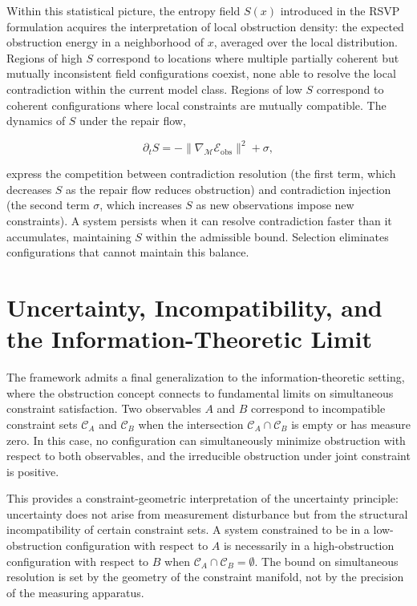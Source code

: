 \documentclass[12pt, a4paper, oneside]{article}
\theoremstyle{plain}
\theoremstyle{definition}
\theoremstyle{remark}
\newcommand{\C}{\mathcal{C}}
\begin{document}
Within this statistical picture, the entropy field $S(x)$ introduced in the RSVP formulation acquires the interpretation of local obstruction density: the expected obstruction energy in a neighborhood of $x$, averaged over the local distribution. Regions of high $S$ correspond to locations where multiple partially coherent but mutually inconsistent field configurations coexist, none able to resolve the local contradiction within the current model class. Regions of low $S$ correspond to coherent configurations where local constraints are mutually compatible. The dynamics of $S$ under the repair flow,

\begin{equation}
\partial_t S = -\|\nabla_\mathcal{M} \mathcal{E}_{\mathrm{obs}}\|^2 + \sigma,
\end{equation}

express the competition between contradiction resolution (the first term, which decreases $S$ as the repair flow reduces obstruction) and contradiction injection (the second term $\sigma$, which increases $S$ as new observations impose new constraints). A system persists when it can resolve contradiction faster than it accumulates, maintaining $S$ within the admissible bound. Selection eliminates configurations that cannot maintain this balance.

\section{Uncertainty, Incompatibility, and the Information-Theoretic Limit}

The framework admits a final generalization to the information-theoretic setting, where the obstruction concept connects to fundamental limits on simultaneous constraint satisfaction. Two observables $A$ and $B$ correspond to incompatible constraint sets $\C_A$ and $\C_B$ when the intersection $\C_A \cap \C_B$ is empty or has measure zero. In this case, no configuration can simultaneously minimize obstruction with respect to both observables, and the irreducible obstruction under joint constraint is positive.

This provides a constraint-geometric interpretation of the uncertainty principle: uncertainty does not arise from measurement disturbance but from the structural incompatibility of certain constraint sets. A system constrained to be in a low-obstruction configuration with respect to $A$ is necessarily in a high-obstruction configuration with respect to $B$ when $\C_A \cap \C_B = \emptyset$. The bound on simultaneous resolution is set by the geometry of the constraint manifold, not by the precision of the measuring apparatus.
\end{document}
